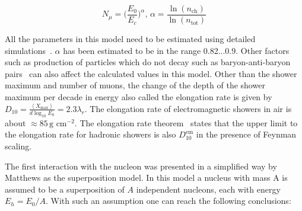 \begin{equation}
    N_{\mu} = \biggl(\frac{E_0}{E_c}\biggr)^{\alpha} , \, \alpha = \frac{\ln (n_{\text{ch}})}{\ln (n_{\text{tot}})}
\end{equation}

All the parameters in this model need to be estimated using detailed simulations~\cite{PhysRevD.66.033011}. $\alpha$ has been estimated to be in the range 0.82...0.9. Other factors such as production of particles which do not decay such as baryon-anti-baryon pairs~\cite{ Pierog:2006qv} can also affect the calculated values in this model. Other than the shower maximum and number of muons, the change of the depth of the shower maximum per decade in energy also called the elongation rate is given by $D_{10} = \frac{\left\langle X_{\text{max}}\right\rangle }{d\log_{10}E_0} = 2.3\lambda_r$. The elongation rate of electromagnetic showers in air is about $\approx 85\,\text{g cm}^{-2}$. The elongation rate theorem~\cite{Linsley_1977} states that the upper limit to the elongation rate for hadronic showers is also $D_{10}^{\text{em}}$ in the presence of Feynman scaling.

The first interaction with the nucleon was presented in a simplified way by Matthews as the superposition model. In this model a nucleus with mass A is assumed to be a superposition of $A$ independent nucleons, each with energy $E_h = E_0/A$. With such an assumption one can reach the following conclusions:

